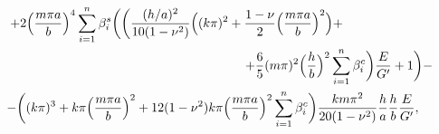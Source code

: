 \begin{multline}
+2\Bigl(  \frac{m\pi a}{b}\Bigr)^4 \sum_{i=1}^n \beta_i^s

\biggl( \biggl( \frac{({h}/{a})^2}{10(1-\nu^2)} 

\Bigl((k\pi)^2+\frac{1-\nu}{2}\Bigl(\frac{m\pi a}{b}\Bigr)^2\Bigr)+ \hspace{2cm} 

\\

\hspace{7cm}+\frac{6}{5}(m\pi)^2 \Bigl(\frac{h}{b}\Bigr)^2   \sum_{i=1}^n \beta_i^c\biggr)\frac{E}{G'}+1\biggr)-

\\

-\biggl((k\pi)^3+k\pi\Bigl(\frac{m\pi a}{b}\Bigr)^2+

12(1-\nu^2)k\pi\Bigl(\frac{m\pi a}{b}\Bigr)^2 

\sum_{i=1}^n\beta_i^c \biggr)

\frac{km\pi^2}{20(1-\nu^2)}\frac{h}{a}\frac{h}{b}\frac{E}{G'},

\end{multline}






